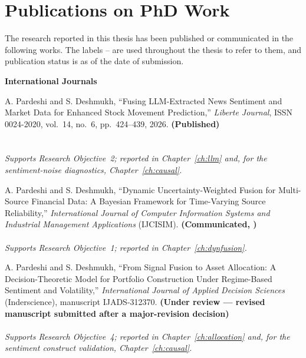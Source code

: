 \chapter*{Publications on PhD Work}
\setcounter{table}{0}
\renewcommand{\thetable}{P.\arabic{table}}

The research reported in this thesis has been published or communicated in the following works.
The labels -- are used throughout the thesis to refer to them, and
publication status is as of the date of submission.

\vspace{0.6em}
\textbf{International Journals}

\begin{enumerate}[label={[P\arabic*]},leftmargin=2.9em,start=3]
\item A. Pardeshi and S. Deshmukh, ``Fusing LLM-Extracted News Sentiment and Market Data for
Enhanced Stock Movement Prediction,'' \emph{Liberte Journal}, ISSN 0024-2020, vol.~14, no.~6,
pp.~424--439, 2026. \textbf{(Published)}\\
\indexing{\LiberteIndexing} \\ \link{\LiberteURL}\\
\textit{Supports Research Objective~2; reported in Chapter~\ref{ch:llm} and, for the
sentiment-noise diagnostics, Chapter~\ref{ch:causal}.}

\item A. Pardeshi and S. Deshmukh, ``Dynamic Uncertainty-Weighted Fusion for Multi-Source
Financial Data: A Bayesian Framework for Time-Varying Source Reliability,''
\emph{International Journal of Computer Information Systems and Industrial Management
Applications} (IJCISIM). \textbf{(Communicated, \IJCISIMDate)}\\
\link{\IJCISIMURL}\\
\textit{Supports Research Objective~1; reported in Chapter~\ref{ch:dynfusion}.}

\item A. Pardeshi and S. Deshmukh, ``From Signal Fusion to Asset Allocation: A
Decision-Theoretic Model for Portfolio Construction Under Regime-Based Sentiment and
Volatility,'' \emph{International Journal of Applied Decision Sciences} (Inderscience),
manuscript IJADS-312370. \textbf{(Under review --- revised manuscript submitted after a
major-revision decision)}\\
\link{\IJADSURL}\\
\textit{Supports Research Objective~4; reported in Chapter~\ref{ch:allocation} and, for the
sentiment construct validation, Chapter~\ref{ch:causal}.}
\end{enumerate}

